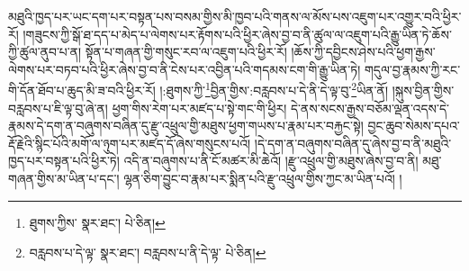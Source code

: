 མཐུའི་ཁྱད་པར་ཡང་དག་པར་བསྟན་པས་བསམ་གྱིས་མི་ཁྱབ་པའི་གནས་ལ་མོས་པས་འཇུག་པར་འགྱུར་བའི་ཕྱིར་རོ། །གཟུངས་ཀྱི་སྒོ་ཐ་དད་པ་མེད་པ་ལེགས་པར་རྟོགས་པའི་ཕྱིར་ཞེས་བྱ་བ་ནི་ཚུལ་ལ་འཇུག་པའི་རྒྱུ་ཡིན་ཏེ་ཆོས་ཀྱི་ཚུལ་ནུབ་པ་ན། སྟོན་པ་གཞན་གྱི་གསུང་རབ་ལ་འཇུག་པའི་ཕྱིར་རོ། །ཆོས་ཀྱི་དབྱིངས་ཤེས་པའི་ཕྱག་རྒྱས་ལེགས་པར་བཏབ་པའི་ཕྱིར་ཞེས་བྱ་བ་ནི་ངེས་པར་འབྱིན་པའི་གདམས་ངག་གི་རྒྱུ་ཡིན་ཏེ། གདུལ་བྱ་རྣམས་ཀྱི་རང་གི་དོན་ཐོབ་པ་ཆུད་མི་ཟ་བའི་ཕྱིར་རོ། །:ཐུགས་ཀྱི་\footnote{ཐུགས་ཀྱིས་  སྣར་ཐང་།  པེ་ཅིན། }བྱིན་གྱིས་:བརླབས་པ་དེ་ནི་དེ་ལྟ་བུ་\footnote{བརླབས་པ་དེ་ལྟ་  སྣར་ཐང་། བརླབས་པ་ནི་དེ་ལྟ་  པེ་ཅིན། }ཡིན་ནོ། །སྐུས་བྱིན་གྱིས་བརླབས་པ་ཇི་ལྟ་བུ་ཞེ་ན། ཕྱག་གིས་རེག་པར་མཛད་པ་སྟེ་གང་གི་ཕྱིར། དེ་ནས་སངས་རྒྱས་བཅོམ་ལྡན་འདས་དེ་རྣམས་དེ་དག་ན་བཞུགས་བཞིན་དུ་རྫུ་འཕྲུལ་གྱི་མཐུས་ཕྱག་གཡས་པ་རྣམ་པར་བརྐྱང་སྟེ། བྱང་ཆུབ་སེམས་དཔའ་རྡོ་རྗེའི་སྙིང་པོའི་མགོ་ལ་ཉུག་པར་མཛད་དོ་ཞེས་གསུངས་པའོ། །དེ་དག་ན་བཞུགས་བཞིན་དུ་ཞེས་བྱ་བ་ནི་མཐུའི་ཁྱད་པར་བསྟན་པའི་ཕྱིར་ཏེ། འདི་ན་བཞུགས་པ་ནི་ངོ་མཚར་མི་ཆེའོ། །རྫུ་འཕྲུལ་གྱི་མཐུས་ཞེས་བྱ་བ་ནི། མཐུ་གཞན་གྱིས་མ་ཡིན་པ་དང་། ལྷན་ཅིག་བྱུང་བ་རྣམ་པར་སྨིན་པའི་རྫུ་འཕྲུལ་གྱིས་ཀྱང་མ་ཡིན་པའོ། །

